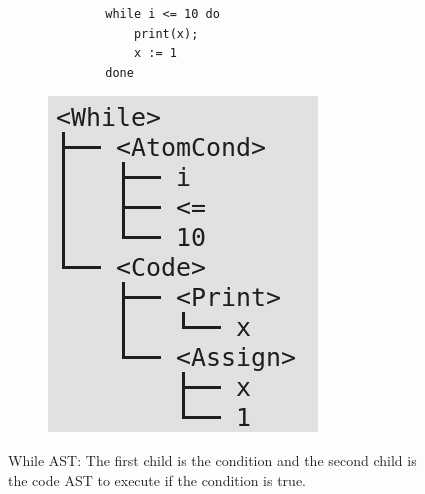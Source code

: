 \documentclass[letterpaper]{article}
\begin{document}
\begin{figure}[H]
    \begin{subfigure}{.5\textwidth}
        \begin{lstlisting}
        while i <= 10 do
            print(x);
            x := 1
        done
        \end{lstlisting}
    \end{subfigure}
    \begin{subfigure}{.5\textwidth}
    \includegraphics[scale=0.5]{image/while.png}
    \end{subfigure}

    \caption{While AST: The first child is the condition and the
    second child is the code AST to execute if the condition is true.}
\end{figure}
\end{document}
